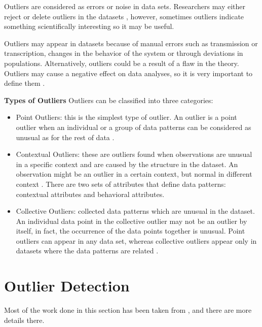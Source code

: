 Outliers are considered as errors or noise in data sets. Researchers may either reject or delete outliers in the datasets%
, however, sometimes outliers indicate something scientifically interesting so it may be useful. %

Outliers may appear in datasets because of manual errors such as transmission or transcription, changes in the behavior of the system or through deviations in populations. Alternatively, outliers could be a result of a flaw in the theory. Outliers may cause a negative effect on data analyses, so it is very important to define them \citep{Outlier}.

\textbf{Types of Outliers}
Outliers can be classified into three categories:
\begin{itemize}
\item{Point Outliers:} this is the simplest type of outlier. An outlier is a point outlier when an individual or a group of data patterns can be considered as unusual as for the rest of data \citep{Outlier}.
\item{Contextual Outliers:} 
these are outliers found when observations are unusual in a specific context and are caused by the structure in the dataset. An observation might be an outlier in a certain context, but normal in different context \citep{Kurukshetra}. There are two sets of attributes that define data patterns: contextual attributes and behavioral attributes.
\item{Collective Outliers:} 
collected data patterns which are unusual in the dataset. An individual data point in the collective outlier may not be an outlier by itself, in fact, the occurrence of the data points together is unusual. Point outliers can appear in any data set, whereas collective outliers appear only in datasets where the data patterns are related \citep{Kurukshetra}.
\end{itemize}

\section{Outlier Detection}
Most of the work done in this section has been taken from \citep{Kurukshetra}, and there are more details there.

